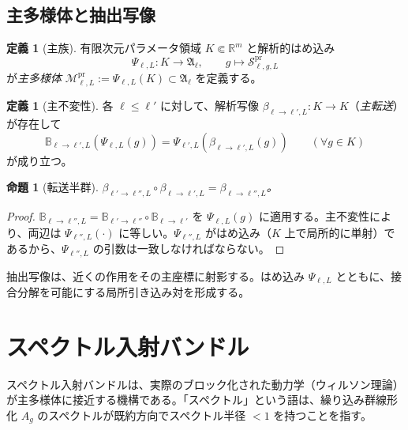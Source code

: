 \documentclass[12pt]{article}
\theoremstyle{plain}
\newtheorem{proposition}[theorem]{命題}
\theoremstyle{definition}
\newtheorem{definition}[theorem]{定義}
\numberwithin{equation}{section}
\newcommand{\R}{\mathbb{R}}
\newcommand{\fA}{\mathfrak{A}}
\newcommand{\pr}{\mathrm{pr}}
\begin{document}
\subsection{主多様体と抽出写像}

\begin{definition}[主族]
有限次元パラメータ領域 $K\Subset\R^m$ と解析的はめ込み
\begin{equation}
\Psi_{\ell,L}:K\to\fA_\ell,\qquad g\mapsto\mathcal{S}^{\pr}_{\ell,g,L}
\end{equation}
が\emph{主多様体} $\mathcal{M}^{\pr}_{\ell,L}:=\Psi_{\ell,L}(K)\subset\fA_\ell$ を定義する。
\end{definition}

\begin{definition}[主不変性]
各 $\ell\leq\ell'$ に対して、解析写像 $\beta_{\ell\to\ell',L}:K\to K$（\emph{主転送}）が存在して
\begin{equation}
\mathbb{B}_{\ell\to\ell',L}(\Psi_{\ell,L}(g)) = \Psi_{\ell',L}(\beta_{\ell\to\ell',L}(g))\qquad(\forall g\in K)
\end{equation}
が成り立つ。
\end{definition}

\begin{proposition}[転送半群]
$\beta_{\ell'\to\ell'',L}\circ\beta_{\ell\to\ell',L}=\beta_{\ell\to\ell'',L}$。
\end{proposition}

\begin{proof}
$\mathbb{B}_{\ell\to\ell'',L}=\mathbb{B}_{\ell'\to\ell''}\circ\mathbb{B}_{\ell\to\ell'}$ を $\Psi_{\ell,L}(g)$ に適用する。主不変性により、両辺は $\Psi_{\ell'',L}(\cdot)$ に等しい。$\Psi_{\ell'',L}$ がはめ込み（$K$ 上で局所的に単射）であるから、$\Psi_{\ell'',L}$ の引数は一致しなければならない。
\end{proof}

抽出写像は、近くの作用をその主座標に射影する。はめ込み $\Psi_{\ell,L}$ とともに、接合分解を可能にする局所引き込み対を形成する。

\section{スペクトル入射バンドル}\label{sec:spectralentry}

スペクトル入射バンドルは、実際のブロック化された動力学（ウィルソン理論）が主多様体に接近する機構である。「スペクトル」という語は、繰り込み群線形化 $A_g$ のスペクトルが既約方向でスペクトル半径 $<1$ を持つことを指す。
\end{document}
